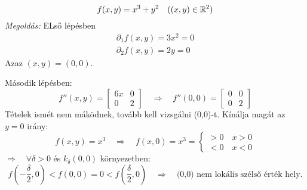 \documentclass[a4paper,11.5pt]{article}
\begin{document}
	\begin{task}
		\[ f(x,y)=x^3+y^2\quad ((x,y)\in\mathbb{R}^2) \]
		\textit{Megoldás:} ELső lépésben
		\begin{align*}
			\partial_1f(x,y)=3x^2=0\\
			\partial_2f(x,y)=2y=0
		\end{align*}
		Azaz $(x,y)=(0,0)$.
		
		Második lépésben:
		\[ f''(x,y)=\begin{bmatrix}
			6x&0\\
			0&2
		\end{bmatrix}\quad \Rightarrow\quad f''(0,0)=\begin{bmatrix}
			0&0\\
			0&2
		\end{bmatrix} \]
		Tételek ismét nem máködnek, tovább kell vizsgálni (0,0)-t. Kínálja magát az $y=0$ irány:
		\[ f(x,y)=x^3\quad \Rightarrow\quad f(x,0)=x^3=\begin{cases}
			>0\quad x>0\\
			<0\quad x<0
		\end{cases} \]
		$\Rightarrow\quad \forall\delta>0$ és $k_\delta(0,0)$ környezetben:
		\[ f\left(-\frac{\delta}{2},0\right)<f(0,0)=0<f\left(\frac{\delta}{2},0\right)\quad \Rightarrow\quad \text{(0,0) nem lokális szélső érték hely.} \]
	\end{task}
\end{document}
